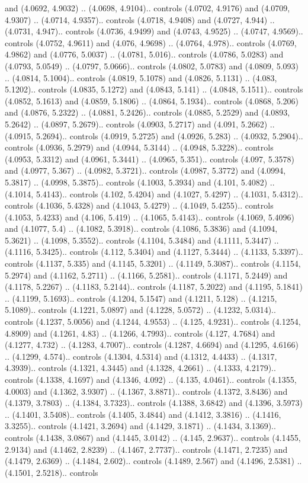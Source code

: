 and (4.0692, 4.9032) .. (4.0698, 4.9104).. controls (4.0702, 4.9176) and (4.0709, 4.9307) .. (4.0714, 4.9357).. controls (4.0718, 4.9408) and (4.0727, 4.944) .. (4.0731, 4.947).. controls (4.0736, 4.9499) and (4.0743, 4.9525) .. (4.0747, 4.9569).. controls (4.0752, 4.9611) and (4.076, 4.9698) .. (4.0764, 4.978).. controls (4.0769, 4.9862) and (4.0776, 5.0037) .. (4.0781, 5.016).. controls (4.0786, 5.0283) and (4.0793, 5.0549) .. (4.0797, 5.0666).. controls (4.0802, 5.0783) and (4.0809, 5.093) .. (4.0814, 5.1004).. controls (4.0819, 5.1078) and (4.0826, 5.1131) .. (4.083, 5.1202).. controls (4.0835, 5.1272) and (4.0843, 5.141) .. (4.0848, 5.1511).. controls (4.0852, 5.1613) and (4.0859, 5.1806) .. (4.0864, 5.1934).. controls (4.0868, 5.206) and (4.0876, 5.2322) .. (4.0881, 5.2426).. controls (4.0885, 5.2529) and (4.0893, 5.2642) .. (4.0897, 5.2679).. controls (4.0903, 5.2717) and (4.091, 5.2662) .. (4.0915, 5.2694).. controls (4.0919, 5.2725) and (4.0926, 5.283) .. (4.0932, 5.2904).. controls (4.0936, 5.2979) and (4.0944, 5.3144) .. (4.0948, 5.3228).. controls (4.0953, 5.3312) and (4.0961, 5.3441) .. (4.0965, 5.351).. controls (4.097, 5.3578) and (4.0977, 5.367) .. (4.0982, 5.3721).. controls (4.0987, 5.3772) and (4.0994, 5.3817) .. (4.0998, 5.3875).. controls (4.1003, 5.3934) and (4.101, 5.4082) .. (4.1014, 5.4143).. controls (4.102, 5.4204) and (4.1027, 5.4297) .. (4.1031, 5.4312).. controls (4.1036, 5.4328) and (4.1043, 5.4279) .. (4.1049, 5.4255).. controls (4.1053, 5.4233) and (4.106, 5.419) .. (4.1065, 5.4143).. controls (4.1069, 5.4096) and (4.1077, 5.4) .. (4.1082, 5.3918).. controls (4.1086, 5.3836) and (4.1094, 5.3621) .. (4.1098, 5.3552).. controls (4.1104, 5.3484) and (4.1111, 5.3447) .. (4.1116, 5.3425).. controls (4.112, 5.3404) and (4.1127, 5.3444) .. (4.1133, 5.3397).. controls (4.1137, 5.335) and (4.1145, 5.3201) .. (4.1149, 5.3087).. controls (4.1154, 5.2974) and (4.1162, 5.2711) .. (4.1166, 5.2581).. controls (4.1171, 5.2449) and (4.1178, 5.2267) .. (4.1183, 5.2144).. controls (4.1187, 5.2022) and (4.1195, 5.1841) .. (4.1199, 5.1693).. controls (4.1204, 5.1547) and (4.1211, 5.128) .. (4.1215, 5.1089).. controls (4.1221, 5.0897) and (4.1228, 5.0572) .. (4.1232, 5.0314).. controls (4.1237, 5.0056) and (4.1244, 4.9553) .. (4.125, 4.9231).. controls (4.1254, 4.8909) and (4.1261, 4.83) .. (4.1266, 4.7993).. controls (4.127, 4.7684) and (4.1277, 4.732) .. (4.1283, 4.7007).. controls (4.1287, 4.6694) and (4.1295, 4.6166) .. (4.1299, 4.574).. controls (4.1304, 4.5314) and (4.1312, 4.4433) .. (4.1317, 4.3939).. controls (4.1321, 4.3445) and (4.1328, 4.2661) .. (4.1333, 4.2179).. controls (4.1338, 4.1697) and (4.1346, 4.092) .. (4.135, 4.0461).. controls (4.1355, 4.0003) and (4.1362, 3.9307) .. (4.1367, 3.8871).. controls (4.1372, 3.8436) and (4.1379, 3.7803) .. (4.1384, 3.7323).. controls (4.1388, 3.6842) and (4.1396, 3.5973) .. (4.1401, 3.5408).. controls (4.1405, 3.4844) and (4.1412, 3.3816) .. (4.1416, 3.3255).. controls (4.1421, 3.2694) and (4.1429, 3.1871) .. (4.1434, 3.1369).. controls (4.1438, 3.0867) and (4.1445, 3.0142) .. (4.145, 2.9637).. controls (4.1455, 2.9134) and (4.1462, 2.8239) .. (4.1467, 2.7737).. controls (4.1471, 2.7235) and (4.1479, 2.6369) .. (4.1484, 2.602).. controls (4.1489, 2.567) and (4.1496, 2.5381) .. (4.1501, 2.5218).. controls 